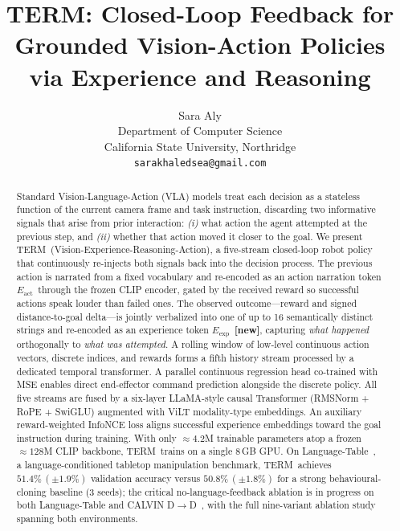 \documentclass{article}
\title{\textbf{TERM}: Closed-Loop Feedback for\\
       Grounded Vision-Action Policies via Experience and Reasoning}
\author{Sara Aly \\
  Department of Computer Science \\
  California State University, Northridge \\
  \texttt{sarakhaledsea@gmail.com}}
\newcommand{\modelname}{\textsc{TERM}\xspace}
\newcommand{\Lact}{$E_{\mathrm{act}}$\xspace}
\newcommand{\Lexp}{$E_{\mathrm{exp}}$\xspace}
\newcommand{\NEW}{\textcolor{NewOrange}{\textbf{[new]}}\xspace}
\begin{document}
\maketitle

\begin{abstract}
Standard Vision-Language-Action (VLA) models treat each decision as a
stateless function of the current camera frame and task instruction,
discarding two informative signals that arise from prior interaction:
\emph{(i)} what action the agent attempted at the previous step, and
\emph{(ii)} whether that action moved it closer to the goal.
We present \modelname\ (Vision-Experience-Reasoning-Action), a
five-stream closed-loop robot policy that continuously re-injects both
signals back into the decision process.
The previous action is narrated from a fixed vocabulary and
re-encoded as an action narration token \Lact\ through the frozen CLIP
encoder, gated by the received reward so successful actions speak
louder than failed ones.
The observed outcome---reward and signed distance-to-goal delta---is
jointly verbalized into one of up to 16 semantically distinct strings
and re-encoded as an experience token \Lexp\ \NEW, capturing
\emph{what happened} orthogonally to \emph{what was attempted}.
A rolling window of low-level continuous action vectors, discrete
indices, and rewards forms a fifth history stream processed by a
dedicated temporal transformer.
A parallel continuous regression head co-trained with MSE enables
direct end-effector command prediction alongside the discrete policy.
All five streams are fused by a six-layer LLaMA-style causal
Transformer (RMSNorm + RoPE + SwiGLU) augmented with ViLT
modality-type embeddings.
An auxiliary reward-weighted InfoNCE loss aligns successful experience
embeddings toward the goal instruction during training.
With only $\approx\!4.2$M trainable parameters atop a frozen
$\approx\!128$M CLIP backbone, \modelname\ trains on a single 8\,GB GPU.
On Language-Table~\citep{lynch2023languagetable}, a language-conditioned
tabletop manipulation benchmark, \modelname\ achieves
$51.4\%\,(\pm1.9\%)$ validation accuracy versus $50.8\%\,(\pm1.8\%)$
for a strong behavioural-cloning baseline (3 seeds);
the critical no-language-feedback ablation is in progress on both
Language-Table and CALVIN D$\to$D~\citep{mees2022calvin}, with the
full nine-variant ablation study spanning both environments.
\end{abstract}

\end{document}
